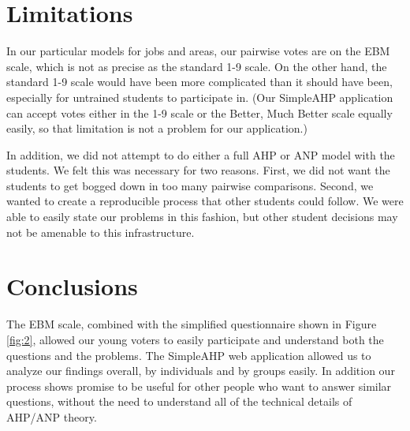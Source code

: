 \documentclass[11pt]{article}
\begin{document}

\section{Limitations}
In our particular models for jobs and areas, our pairwise votes are on the EBM scale, which is not as precise as the standard 1-9 scale.  On the other hand, the standard 1-9 scale would have been more complicated than it should have been, especially for untrained students to participate in.
(Our SimpleAHP application can accept votes either in the 1-9 scale or the Better, Much Better scale equally easily, so that limitation is not a problem for our application.)

In addition, we did not attempt to do either a full AHP or ANP model with
the students.  We felt this was necessary for two reasons.  First, we did not
want the students to get bogged down in too many pairwise comparisons.  Second, we
wanted to create a reproducible process that other students could follow.  We were
able to easily state our problems in this fashion, but other student decisions may
not be amenable to this infrastructure.

\section{Conclusions}
The EBM scale, combined with the simplified questionnaire 
shown in Figure \ref{fig:2},
allowed our young voters to easily participate and understand both the 
questions and the
problems.  The SimpleAHP web application allowed us to analyze our findings overall, by
individuals and by groups easily.  In addition our process shows promise
to be useful for
other people who want to answer similar questions, without the need to 
understand all of the
technical details of AHP/ANP theory.
\end{document}

